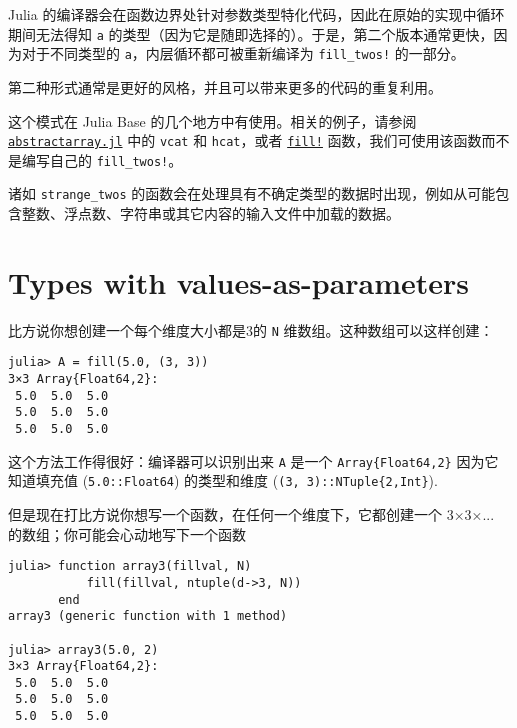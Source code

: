 Julia 的编译器会在函数边界处针对参数类型特化代码，因此在原始的实现中循环期间无法得知 \texttt{a} 的类型（因为它是随即选择的）。于是，第二个版本通常更快，因为对于不同类型的 \texttt{a}，内层循环都可被重新编译为 \texttt{fill\_twos!} 的一部分。



第二种形式通常是更好的风格，并且可以带来更多的代码的重复利用。



这个模式在 Julia Base 的几个地方中有使用。相关的例子，请参阅 \href{https://github.com/JuliaLang/julia/blob/40fe264f4ffaa29b749bcf42239a89abdcbba846/base/abstractarray.jl\#L1205-L1206}{\texttt{abstractarray.jl}} 中的 \texttt{vcat} 和 \texttt{hcat}，或者 \hyperlink{5162290739791026948}{\texttt{fill!}} 函数，我们可使用该函数而不是编写自己的 \texttt{fill\_twos!}。



诸如 \texttt{strange\_twos} 的函数会在处理具有不确定类型的数据时出现，例如从可能包含整数、浮点数、字符串或其它内容的输入文件中加载的数据。



\hypertarget{13298146121388666827}{}


\section{Types with values-as-parameters}



比方说你想创建一个每个维度大小都是3的 \texttt{N} 维数组。这种数组可以这样创建：




\begin{verbatim}
julia> A = fill(5.0, (3, 3))
3×3 Array{Float64,2}:
 5.0  5.0  5.0
 5.0  5.0  5.0
 5.0  5.0  5.0
\end{verbatim}



这个方法工作得很好：编译器可以识别出来 \texttt{A} 是一个 \texttt{Array\{Float64,2\}} 因为它知道填充值 (\texttt{5.0::Float64}) 的类型和维度 (\texttt{(3, 3)::NTuple\{2,Int\}}).



但是现在打比方说你想写一个函数，在任何一个维度下，它都创建一个 3×3×... 的数组；你可能会心动地写下一个函数




\begin{verbatim}
julia> function array3(fillval, N)
           fill(fillval, ntuple(d->3, N))
       end
array3 (generic function with 1 method)

julia> array3(5.0, 2)
3×3 Array{Float64,2}:
 5.0  5.0  5.0
 5.0  5.0  5.0
 5.0  5.0  5.0
\end{verbatim}




